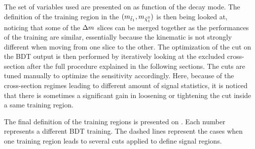         The set of variables used are presented on  as function of the decay mode. The definition
        of the training region in the $(m_{\tilde{t}_1},m_{\tilde{\chi}_1^0})$ is then being looked at, noticing that some of the
        $\Delta m$ slices can be merged together as the performances of the training are similar, essentially because the kinematic
        is not strongly different when moving from one slice to the other. The optimization of the cut on the BDT output is then
        performed by iteratively looking at the excluded cross-section after the full procedure explained in the following sections.
        The cuts are tuned manually to optimize the sensitivity accordingly. Here, because of the cross-section regimes leading to
        different amount of signal statistics, it is noticed that there is sometimes a significant gain in loosening or tightening
        the cut inside a same training region.

        The final definition of the training regions is presented on . Each number represents a
        different BDT training. The dashed lines represent the cases when one training region leads to several cuts applied to define
        signal regions.


